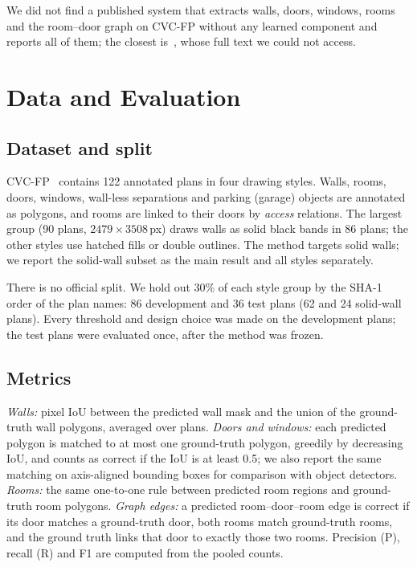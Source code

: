 \documentclass[conference]{IEEEtran}
\begin{document}
We did not find a published system that extracts walls, doors, windows,
rooms and the room--door graph on CVC-FP without any learned component and
reports all of them; the closest is~\cite{delasheras2014statistical}, whose
full text we could not access.

\section{Data and Evaluation}

\subsection{Dataset and split}

CVC-FP~\cite{delasheras2015cvcfp} contains 122 annotated plans in four
drawing styles. Walls, rooms, doors, windows, wall-less separations and
parking (garage) objects are annotated as polygons, and rooms are linked to their doors
by \emph{access} relations. The largest group (90 plans,
$2479\times3508$\,px) draws walls as solid black bands in 86 plans; the
other styles use hatched fills or double outlines. The method targets solid
walls; we report the solid-wall subset as the main result and all styles
separately.

There is no official split. We hold out 30\% of each style group by the
SHA-1 order of the plan names: 86 development and 36 test plans (62 and 24
solid-wall plans). Every threshold and design choice was made on the
development plans; the test plans were evaluated once, after the method was
frozen.

\subsection{Metrics}

\emph{Walls:} pixel IoU between the predicted wall mask and the union of the
ground-truth wall polygons, averaged over plans. \emph{Doors and windows:}
each predicted polygon is matched to at most one ground-truth polygon,
greedily by decreasing IoU, and counts as correct if the IoU is at least
0.5; we also report the same matching on axis-aligned bounding boxes for
comparison with object detectors. \emph{Rooms:} the same one-to-one rule
between predicted room regions and ground-truth room polygons.
\emph{Graph edges:} a predicted room--door--room edge is correct if its door
matches a ground-truth door, both rooms match ground-truth rooms, and the
ground truth links that door to exactly those two rooms. Precision (P),
recall (R) and F1 are computed from the pooled counts.
\end{document}
